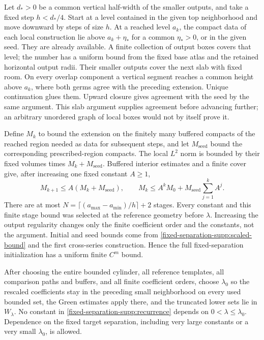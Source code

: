 \documentclass[11pt]{article}
\theoremstyle{definition}
\theoremstyle{remark}
\numberwithin{equation}{section}
\begin{document}
Let $d_*>0$ be a common vertical half-width of the smaller outputs,
and take a fixed step $h<d_*/4$. Start at a level contained in the
given top neighborhood and move downward by steps of size $h$.
At a reached level $a_k$, the compact data of each local construction
lie above $a_k+\eta_*$ for a common $\eta_*>0$, or in the given seed.
They are already available. A finite collection of output boxes covers
that level; the number has a uniform bound from the fixed base atlas
and the retained horizontal output radii. Their smaller outputs cover
the next slab with fixed room. On every overlap component a vertical
segment reaches a common height above $a_k$, where both germs agree
with the preceding extension. Unique continuation glues them.
Upward closure gives agreement with the seed by the same argument.
This slab argument supplies agreement before advancing further; an
arbitrary unordered graph of local boxes would not by itself prove it.

Define $M_k$ to bound the extension on the finitely many buffered
compacts of the reached region needed as data for subsequent steps,
and let $M_{\mathrm{seed}}$ bound the corresponding prescribed-region
compacts. The local $L^2$ norm is bounded by their fixed volumes times
$M_k+M_{\mathrm{seed}}$. Buffered interior estimates and a finite cover
give, after increasing one fixed constant $A\ge1$,
\begin{equation}\label{fixed-separation-supp:recurrence}
 M_{k+1}\le A(M_k+M_{\mathrm{seed}}),\qquad
 M_k\le A^kM_0+M_{\mathrm{seed}}\sum_{j=1}^kA^j.
\end{equation}
There are at most
$N=\lceil(a_{\max}-a_{\min})/h\rceil+2$ stages. Every constant and
this finite stage bound was selected at the reference geometry before
$\lambda$. Increasing the output regularity changes only the finite
coefficient order and the constants, not the argument. Initial and
seed bounds come from \eqref{fixed-separation-supp:scaled-bound} and
the first cross-series construction. Hence the full fixed-separation
initialization has a uniform finite $C^m$ bound.

After choosing the entire bounded cylinder, all reference templates,
all comparison paths and buffers, and all finite coefficient orders,
choose $\lambda_0$ so the rescaled coefficients stay in the preceding
small neighborhood on every used bounded set, the Green estimates
apply there, and the truncated lower sets lie in $W_\lambda$.
No constant in \eqref{fixed-separation-supp:recurrence} depends on
$0<\lambda\le\lambda_0$. Dependence on the fixed target separation,
including very large constants or a very small $\lambda_0$, is allowed.
\end{document}
